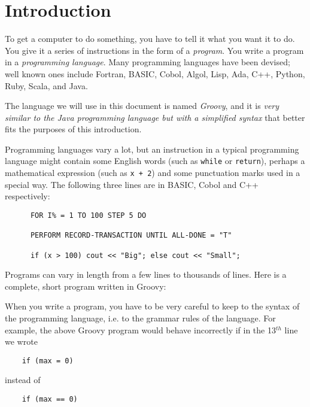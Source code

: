 \section{Introduction}


To get a computer to do something, you have to tell it what you want it
to do.  You give it a series of instructions in the form of a \emph{program}.
You write a program in a \emph{programming language}.
Many programming languages have been devised; well known ones include
Fortran, BASIC, Cobol, Algol, Lisp, Ada, C++, Python, Ruby, Scala, and Java.

The language we will use in this document is named \emph{Groovy}, and
it is \emph{very similar to the Java programming language but with a
simplified syntax} that better fits the purposes of this introduction. 

Programming languages vary a lot, but
an instruction in a typical programming language might contain
some English words (such as \verb!while! or \verb!return!), perhaps a mathematical
expression (such as \verb!x + 2!) and some punctuation marks used in a special way.
The following three lines are in BASIC, Cobol and C++ respectively:
\begin{Verbatim}
      FOR I% = 1 TO 100 STEP 5 DO

      PERFORM RECORD-TRANSACTION UNTIL ALL-DONE = "T"

      if (x > 100) cout << "Big"; else cout << "Small";
\end{Verbatim}

Programs can vary in length from a few lines to thousands of lines.
Here is a complete, short program written in Groovy:


When you write a program, you have to be very careful to keep to the
syntax of the programming language, i.e. to the grammar rules of the language.  
For example, the above Groovy program would
behave incorrectly if in the 13$^{th}$ line we wrote 

\begin{Verbatim}
	if (max = 0)
\end{Verbatim}

instead of 

\begin{Verbatim}
	if (max == 0)
\end{Verbatim}


